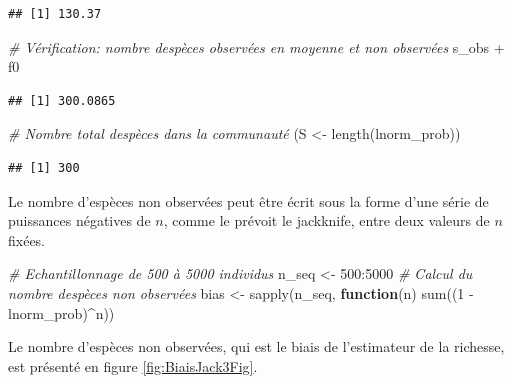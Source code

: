 \documentclass[
  11pt,
  american,
  a4paper,
  extrafontsizes,onecolumn,openright
  ]{memoir}
\newenvironment{Shaded}{\begin{snugshade}}{\end{snugshade}}
\newcommand{\CommentTok}[1]{\textcolor[rgb]{0.56,0.35,0.01}{\textit{#1}}}
\newcommand{\ControlFlowTok}[1]{\textcolor[rgb]{0.13,0.29,0.53}{\textbf{#1}}}
\newcommand{\DecValTok}[1]{\textcolor[rgb]{0.00,0.00,0.81}{#1}}
\newcommand{\FunctionTok}[1]{\textcolor[rgb]{0.00,0.00,0.00}{#1}}
\newcommand{\NormalTok}[1]{#1}
\newcommand{\OtherTok}[1]{\textcolor[rgb]{0.56,0.35,0.01}{#1}}
\newcommand{\SpecialCharTok}[1]{\textcolor[rgb]{0.00,0.00,0.00}{#1}}
\begin{document}
\begin{verbatim}
## [1] 130.37
\end{verbatim}

\begin{Shaded}
\begin{Highlighting}[]
\CommentTok{\# Vérification: nombre d\textquotesingle{}espèces observées en moyenne et non observées}
\NormalTok{s\_obs }\SpecialCharTok{+}\NormalTok{ f0}
\end{Highlighting}
\end{Shaded}

\begin{verbatim}
## [1] 300.0865
\end{verbatim}

\begin{Shaded}
\begin{Highlighting}[]
\CommentTok{\# Nombre total d\textquotesingle{}espèces dans la communauté}
\NormalTok{(S }\OtherTok{\textless{}{-}} \FunctionTok{length}\NormalTok{(lnorm\_prob))}
\end{Highlighting}
\end{Shaded}

\begin{verbatim}
## [1] 300
\end{verbatim}

\normalsize

Le nombre d'espèces non observées peut être écrit sous la forme d'une série de puissances négatives de \(n\), comme le prévoit le jackknife, entre deux valeurs de \(n\) fixées.

\scriptsize

\begin{Shaded}
\begin{Highlighting}[]
\CommentTok{\# Echantillonnage de 500 à 5000 individus}
\NormalTok{n\_seq }\OtherTok{\textless{}{-}} \DecValTok{500}\SpecialCharTok{:}\DecValTok{5000}
\CommentTok{\# Calcul du nombre d\textquotesingle{}espèces non observées}
\NormalTok{bias }\OtherTok{\textless{}{-}} \FunctionTok{sapply}\NormalTok{(n\_seq, }\ControlFlowTok{function}\NormalTok{(n) }\FunctionTok{sum}\NormalTok{((}\DecValTok{1} \SpecialCharTok{{-}}\NormalTok{ lnorm\_prob)}\SpecialCharTok{\^{}}\NormalTok{n))}
\end{Highlighting}
\end{Shaded}

\normalsize

Le nombre d'espèces non observées, qui est le biais de l'estimateur de la richesse, est présenté en figure \ref{fig:BiaisJack3Fig}.
\end{document}
